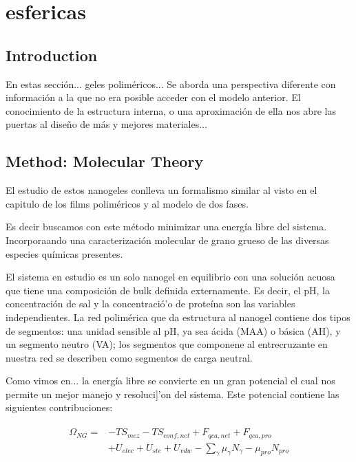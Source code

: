 \chapter{esfericas}

\section{Introduction}


En estas secci\'on... geles polim\'ericos... 
Se aborda una perspectiva diferente con informaci\'on a la que no era posible acceder con el modelo anterior.
El conocimiento  de la estructura interna, o una aproximaci\'on de ella nos abre las puertas al dise\~no de m\'as y mejores materiales...

\section{Method: Molecular Theory}

El estudio de estos nanogeles conlleva un formalismo similar al visto en el capitulo de los films polim\'ericos y al modelo de dos fases.


Es decir buscamos con este m\'etodo  minimizar una energ\'ia libre del sistema.
Incorporaando una caracterizaci\'on molecular de grano grueso de las diversas especies qu\'imicas presentes.

El sistema en estudio es un solo nanogel en equilibrio con una solución acuosa que tiene una composici\'on de bulk definida externamente.
Es decir, el pH, la concentraci\'on de sal y la concentració'o de prote\'ina son las variables independientes.
La red polim\'erica que da estructura al nanogel contiene dos tipos de segmentos: una unidad sensible al pH, ya sea \'acida (MAA) o b\'asica (AH), y un segmento neutro (VA);
los segmentos que componene al entrecruzante en nuestra red se describen como segmentos de carga neutral.

Como vimos en... la energ\'ia libre se convierte en un gran potencial el cual nos permite un mejor manejo y resoluci]'on del sistema.
Este potencial contiene las siguientes contribuciones:

\begin{align}
\begin{aligned}
\Omega_{NG}=& -TS_{mez} -TS_{conf,net} + F_{qca,net} + F_{qca,pro}\\
& + U_{elec} + U_{ste} + U_{vdw} - \sum_{\gamma}{\mu_\gamma N_\gamma} - \mu_{pro} N_{pro}
\end{aligned}
\label{eq:esf:semicano}
\end{align}


